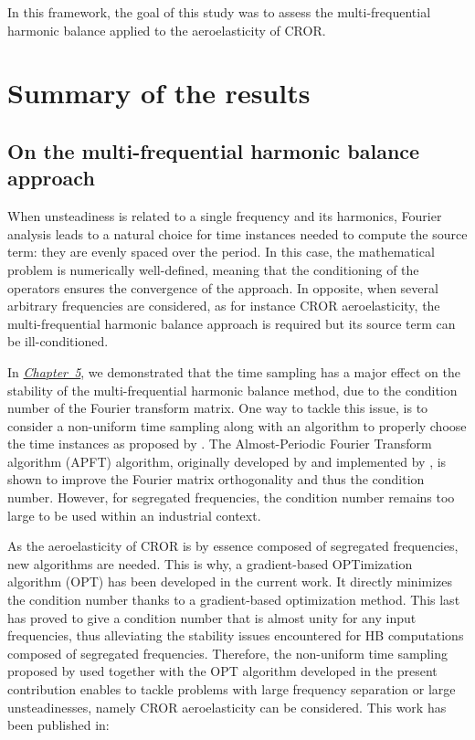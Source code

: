 In this framework, the goal of this study 
was to assess the multi-frequential 
harmonic balance applied to the aeroelasticity of CROR. 

\section*{Summary of the results}

\subsection*{On the multi-frequential harmonic balance approach}

When unsteadiness is related to a single frequency and its
harmonics, Fourier analysis leads to a natural choice for time instances
needed to compute the source term:
they are evenly spaced over the period. In this case, the mathematical
problem is numerically well-defined, meaning that the conditioning of
the operators ensures the convergence of the approach.
In opposite, when several arbitrary frequencies are 
considered, as for instance CROR
aeroelasticity, the multi-frequential harmonic balance approach
is required but its source term can be ill-conditioned.

In \hyperref[cha:limitations_condition_number]{\emph{Chapter~5}},
we demonstrated that the time sampling has a major effect on the
stability of the multi-frequential harmonic balance 
method, due to the condition number of the Fourier
transform matrix. One way to tackle this issue, 
is to consider a non-uniform time sampling
along with an algorithm to properly choose the time instances
as proposed by \citet{ThesisGuedeney}.
The Almost-Periodic Fourier Transform algorithm (APFT) 
algorithm, originally developed by \citet{Kundert1988} and implemented by 
\citet{ThesisGuedeney}, is shown to improve the
Fourier matrix orthogonality and thus the condition number.
However, for segregated frequencies, the condition number
remains too large to be used within an industrial context.

As the aeroelasticity of CROR is by essence
composed of segregated frequencies, new algorithms are needed.
This is why, a gradient-based OPTimization algorithm (OPT) 
has been developed in the current work.
It directly minimizes the condition number thanks to a
gradient-based optimization method. This last has proved to
give a condition number that is almost unity for any input frequencies,
thus alleviating the stability issues encountered for HB
computations composed of segregated frequencies.
Therefore, the non-uniform time sampling proposed by \citet{ThesisGuedeney}
used together with the OPT algorithm 
developed in the present contribution
enables to tackle problems with large frequency 
separation or large unsteadinesses, namely CROR aeroelasticity
can be considered.
This work has been published in:

